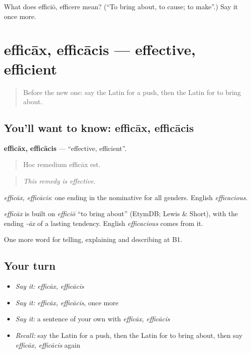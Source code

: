 \begin{tcolorbox}[breakable,colback=teal!4,colframe=teal!35!black,title={Before you move on}]
What does efficiō, efficere mean? (\textquotedblleft{}To bring about, to cause; to make\textquotedblright{}.) Say it once more.
\end{tcolorbox}
\section[efficāx, efficācis]{efficāx, efficācis — effective, efficient}

\label{lesson:LA-C372-efficax}



\begin{quote}
Before the new one: say the Latin for a push, then the Latin for to bring about.
\end{quote}

\subsection*{You'll want to know: efficāx, efficācis}
\textbf{efficāx, efficācis} — \textquotedblleft{}effective, efficient\textquotedblright{}.

\begin{quote}
Hoc remedium efficāx est.
\end{quote}

\begin{quote}
\emph{This remedy is effective.}
\end{quote}

\emph{efficāx, efficācis}: one ending in the nominative for all genders. English \emph{efficacious}.

\begin{cousinweb}
\emph{efficāx} is built on \emph{efficiō} \textquotedblleft{}to bring about\textquotedblright{} (EtymDB; Lewis \& Short), with the ending \emph{-āx} of a lasting tendency. English \emph{efficacious} comes from it.
\end{cousinweb}

\begin{grammarlens}[title={What you've built}]
One more word for telling, explaining and describing at B1.
\end{grammarlens}

\subsection*{Your turn}
\begin{itemize}
\raggedright
  \item \emph{Say it:} \emph{efficāx, efficācis}
  \item \emph{Say it:} \emph{efficāx, efficācis}, once more
  \item \emph{Say it:} a sentence of your own with \emph{efficāx, efficācis}
  \item \emph{Recall:} say the Latin for a push, then the Latin for to bring about, then say \emph{efficāx, efficācis} again
\end{itemize}

